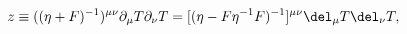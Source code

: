 \begin{equation}
z \equiv ((\eta+F)^{-1})^{\mu \nu}
\partial_\mu T \partial_\nu T =
[(\eta-F\eta^{-1}F)^{-1}]^{\mu\nu}
\del_{\mu}T \del_{\nu}T,
\label{z}
\end{equation}


